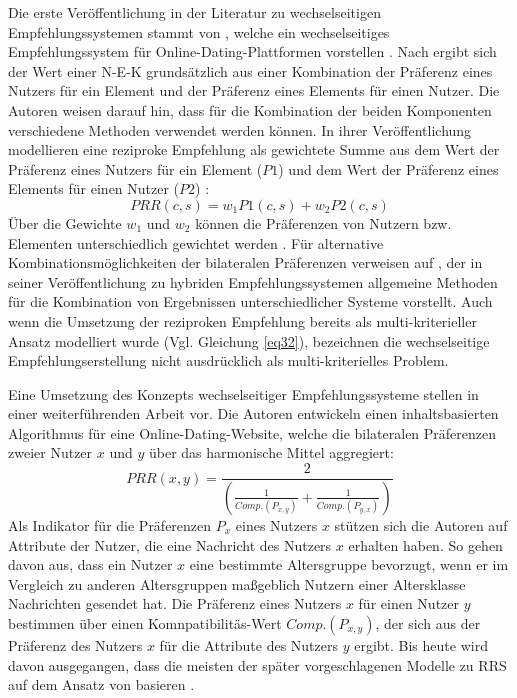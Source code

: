 Die erste Veröffentlichung in der Literatur zu wechselseitigen Empfehlungssystemen stammt von \textcite[S. 1ff.]{pizzato:inproceedings}, welche ein wechselseitiges Empfehlungssystem für Online-Dating-Plattformen vorstellen \cite[S. 1469]{yildirim:article}.
Nach \textcite[S. 5]{pizzato:inproceedings} ergibt sich der Wert einer \ac{N-E-K} grundsätzlich aus einer Kombination der Präferenz eines Nutzers für ein Element und der Präferenz eines Elements für einen Nutzer.
Die Autoren weisen darauf hin, dass für die Kombination der beiden Komponenten verschiedene Methoden verwendet werden können.
In ihrer Veröffentlichung modellieren \textcite[S. 6]{pizzato:inproceedings} eine reziproke Empfehlung als gewichtete Summe aus dem Wert der Präferenz eines Nutzers für ein Element ($P1$) und dem Wert der Präferenz eines Elements für einen Nutzer ($P2$) \cite[S. 6]{pizzato:inproceedings}:
\begin{equation}\label{eq32}
    PRR(c,s) = w_{1}P1(c,s) + w_{2}P2(c,s)
\end{equation}
Über die Gewichte $w_{1}$ und $w_{2}$ können die Präferenzen von Nutzern bzw. Elementen unterschiedlich gewichtet werden \cite[S. 6]{pizzato:inproceedings}.
Für alternative Kombinationsmöglichkeiten der bilateralen Präferenzen verweisen \textcite[S. 5]{pizzato:inproceedings} auf \textcite[S. 339ff.]{burke:article}, der in seiner Veröffentlichung zu hybriden Empfehlungssystemen allgemeine Methoden für die Kombination von Ergebnissen unterschiedlicher Systeme vorstellt.
Auch wenn die Umsetzung der reziproken Empfehlung bereits als multi-kriterieller Ansatz modelliert wurde (Vgl. Gleichung \ref{eq32}), bezeichnen \textcite[S. 1ff.]{pizzato:inproceedings} die wechselseitige Empfehlungserstellung nicht ausdrücklich als multi-kriterielles Problem. 

Eine Umsetzung des Konzepts wechselseitiger Empfehlungssysteme stellen \textcite[S. 207ff.]{pizzato:2010} in einer weiterführenden Arbeit vor.
Die Autoren entwickeln einen inhaltsbasierten Algorithmus für eine Online-Dating-Website, welche die bilateralen Präferenzen zweier Nutzer $x$ und $y$ über das harmonische Mittel aggregiert:
\begin{equation}\label{eq33}
    PRR(x,y) = \frac{2}{(\frac{1}{Comp.(P_{x,y})}+\frac{1}{Comp.(P_{y,x})})}
\end{equation}
Als Indikator für die Präferenzen $P_{x}$ eines Nutzers $x$ stützen sich die Autoren auf Attribute der Nutzer, die eine Nachricht des Nutzers $x$ erhalten haben.
So gehen \textcite[S. 210]{pizzato:2010} davon aus, dass ein Nutzer $x$ eine bestimmte Altersgruppe bevorzugt, wenn er im Vergleich zu anderen Altersgruppen maßgeblich Nutzern einer Altersklasse Nachrichten gesendet hat.
Die Präferenz eines Nutzers $x$ für einen Nutzer $y$ bestimmen \textcite[S. 210]{pizzato:2010} über einen Komnpatibilitäs-Wert $Comp.(P_{x,y})$, der sich aus der Präferenz des Nutzers $x$ für die Attribute des Nutzers $y$ ergibt.
Bis heute wird davon ausgegangen, dass die meisten der später vorgeschlagenen Modelle zu \ac{RRS} auf dem Ansatz von \textcite[S. 207ff.]{pizzato:2010} basieren \cite[S. 723]{kumari:article}.

